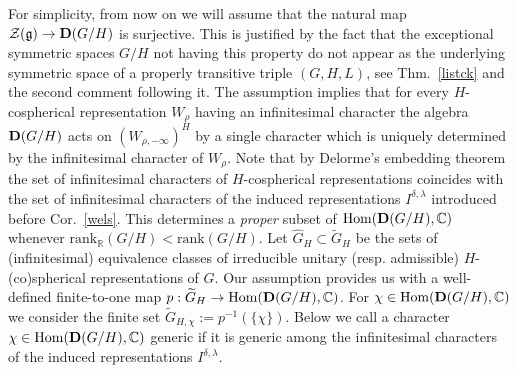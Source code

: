 \documentclass[10]{amsart}
\theoremstyle{remark}
\theoremstyle{definition}
\numberwithin{equation}{section}
\newcommand{\R}{\mathbb{R}}           %
\newcommand{\C}{\mathbb{C}}           %
\newcommand{\rank}{\text{rank}}
\newcommand{\Hom}{\mathrm{Hom}}
\newcommand{\fg}{{\mathfrak g}}
\newcommand{\Cal}{\mathcal}
\begin{document}
{For simplicity, from now on we will assume that the natural map ${\Cal Z}(\fg)\rightarrow {\bf D}(G/H)$ is surjective. This is justified by the fact that the exceptional symmetric spaces $G/H$
not having this property do not appear as the underlying symmetric space of  a properly transitive triple $(G,H,L)$, see Thm.~\ref{listck} and the second comment following it.
The assumption implies that for every $H$-cospherical representation $W_\rho$ having an infinitesimal character the algebra ${\bf D}(G/H)$ acts on $(W_{\rho,-\infty})^H$ by a 
single character which is uniquely
determined by the infinitesimal character of $W_\rho$. Note that by Delorme's embedding theorem the set of infinitesimal characters of $H$-cospherical representations coincides with the set of infinitesimal characters of the induced representations $I^{\delta,\lambda}$ introduced before Cor.~\ref{wels}. This determines a {\em proper} subset of $\Hom({\bf D}(G/H),\C)$ whenever
$\rank_\R(G/H)<\rank(G/H)$. Let $\widehat G_H\subset \widetilde G_H$ be the sets of (infinitesimal) equivalence classes of irreducible unitary (resp. admissible) $H$-(co)spherical representations of $G$.
Our assumption provides us with a well-defined finite-to-one map $p: \widetilde G_H\rightarrow\Hom({\bf D}(G/H),\C)$. For $\chi\in\Hom({\bf D}(G/H),\C)$ we consider the finite set $\widetilde G_{H,\chi}:=p^{-1}(\{\chi\})$. Below we call a character $\chi\in\Hom({\bf D}(G/H),\C)$ generic if it is generic among the infinitesimal characters of the induced representations $I^{\delta,\lambda}$.

}
\end{document}
